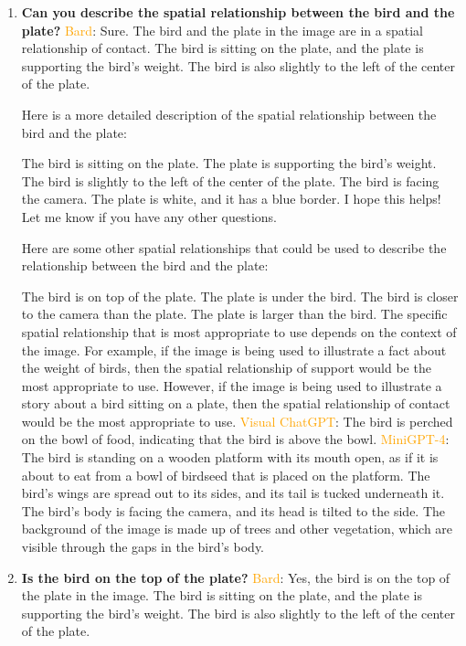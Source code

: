     \begin{enumerate}
        \item \textbf{Can you describe the spatial relationship between the bird and the plate?}
        \subitem \textcolor{orange}{Bard}:
        Sure. The bird and the plate in the image are in a spatial relationship of contact. The bird is sitting on the plate, and the plate is supporting the bird's weight. The bird is also slightly to the left of the center of the plate.
        
        Here is a more detailed description of the spatial relationship between the bird and the plate:
        
        The bird is sitting on the plate.
        The plate is supporting the bird's weight.
        The bird is slightly to the left of the center of the plate.
        The bird is facing the camera.
        The plate is white, and it has a blue border.
        I hope this helps! Let me know if you have any other questions.
        
        Here are some other spatial relationships that could be used to describe the relationship between the bird and the plate:
        
        The bird is on top of the plate.
        The plate is under the bird.
        The bird is closer to the camera than the plate.
        The plate is larger than the bird.
        The specific spatial relationship that is most appropriate to use depends on the context of the image. For example, if the image is being used to illustrate a fact about the weight of birds, then the spatial relationship of support would be the most appropriate to use. However, if the image is being used to illustrate a story about a bird sitting on a plate, then the spatial relationship of contact would be the most appropriate to use.
        \subitem \textcolor{orange}{Visual ChatGPT}: The bird is perched on the bowl of food, indicating that the bird is above the bowl.
        \subitem \textcolor{orange}{MiniGPT-4}: The bird is standing on a wooden platform with its mouth open, as if it is about to eat from a bowl of birdseed that is placed on the platform. The bird’s wings are spread out to its sides, and its tail is tucked underneath it. The bird’s body is facing the camera, and its head is tilted to the side. The background of the image is made up of trees and other vegetation, which are visible through the gaps in the bird’s body.
        \item \textbf{Is the bird on the top of the plate?}
        \subitem \textcolor{orange}{Bard}: 
        Yes, the bird is on the top of the plate in the image. The bird is sitting on the plate, and the plate is supporting the bird's weight. The bird is also slightly to the left of the center of the plate.
        

\end{enumerate}
